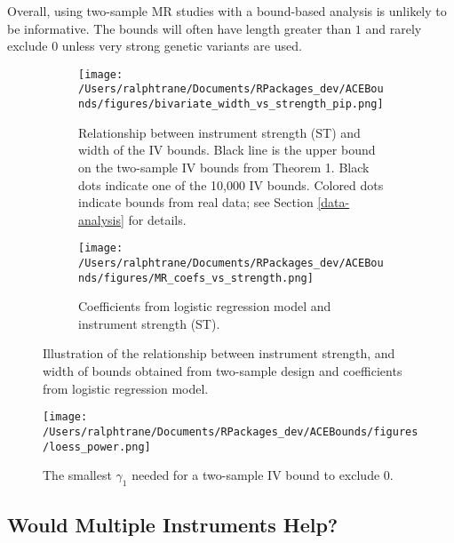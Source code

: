 \documentclass[
]{article}
\theoremstyle{plain}
\begin{document}
Overall, using two-sample MR studies with a bound-based analysis is unlikely to be informative. The bounds will often have length greater than \(1\) and rarely exclude \(0\) unless very strong genetic variants are used.

\begin{figure*}
  \centering
  \begin{subfigure}[t]{0.48\textwidth}
    \texttt{[image: /Users/ralphtrane/Documents/RPackages\_dev/ACEBounds/figures/bivariate\_width\_vs\_strength\_pip.png]}
    \caption{Relationship between instrument strength (ST) and width of the IV bounds. Black line is the upper bound on the two-sample IV bounds from Theorem 1. Black dots indicate one of the 10,000 IV bounds. Colored dots indicate bounds from real data; see Section \ref{data-analysis} for details.}
    \label{fig:biv_width_vs_strength}
  \end{subfigure}%
  \hspace{0.15in}
  \begin{subfigure}[t]{0.48\textwidth}
    \centering
    \texttt{[image: /Users/ralphtrane/Documents/RPackages\_dev/ACEBounds/figures/MR\_coefs\_vs\_strength.png]}
    \caption{Coefficients from logistic regression model and instrument strength (ST).}
    \label{fig:coef_vs_strength}
  \end{subfigure}
  \caption{Illustration of the relationship between instrument strength, and width of bounds obtained from two-sample design and coefficients from logistic regression model.}
  \label{fig:biv_bounds_vs_strength}
\end{figure*}

\begin{figure}[H]
  \centering
  \texttt{[image: /Users/ralphtrane/Documents/RPackages\_dev/ACEBounds/figures/loess\_power.png]}
  \caption{The smallest $\gamma_1$ needed for a two-sample IV bound to exclude $0$.}
  \label{fig:power_curves}
\end{figure}

\hypertarget{would-multiple-instruments-help}{%
\subsection{Would Multiple Instruments Help?}\label{would-multiple-instruments-help}}
\end{document}
